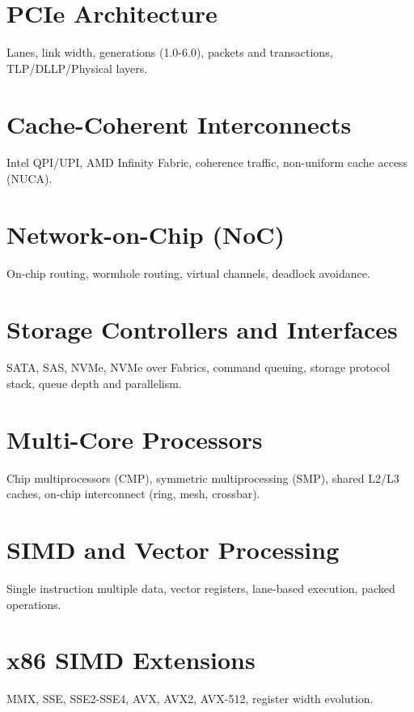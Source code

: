 \chapter{PCIe Architecture}
Lanes, link width, generations (1.0-6.0), packets and transactions, TLP/DLLP/Physical layers.

\chapter{Cache-Coherent Interconnects}
Intel QPI/UPI, AMD Infinity Fabric, coherence traffic, non-uniform cache access (NUCA).

\chapter{Network-on-Chip (NoC)}
On-chip routing, wormhole routing, virtual channels, deadlock avoidance.

\chapter{Storage Controllers and Interfaces}
SATA, SAS, NVMe, NVMe over Fabrics, command queuing, storage protocol stack, queue depth and parallelism.


\chapter{Multi-Core Processors}
Chip multiprocessors (CMP), symmetric multiprocessing (SMP), shared L2/L3 caches, on-chip interconnect (ring, mesh, crossbar).

\chapter{SIMD and Vector Processing}
Single instruction multiple data, vector registers, lane-based execution, packed operations.

\chapter{x86 SIMD Extensions}
MMX, SSE, SSE2-SSE4, AVX, AVX2, AVX-512, register width evolution.

